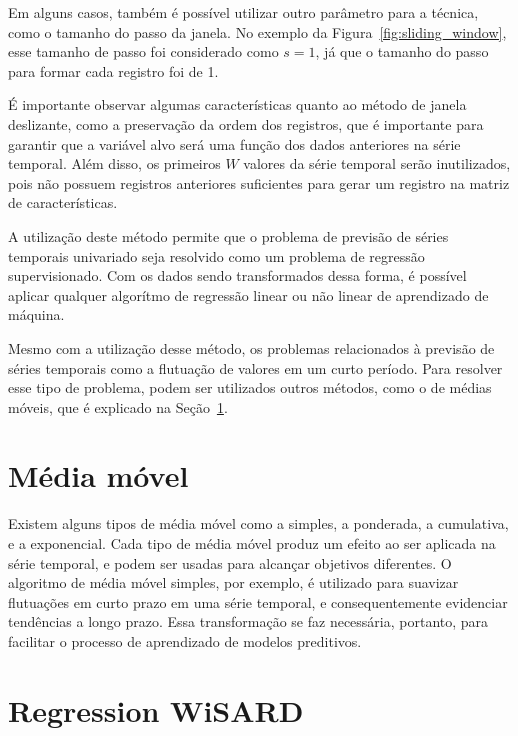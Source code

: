 Em alguns casos, também é possível utilizar outro parâmetro para a técnica, como o tamanho do passo da janela. No exemplo da Figura~\ref{fig:sliding_window}, esse tamanho de passo foi considerado como $s=1$, já que o tamanho do passo para formar cada registro foi de 1.


É importante observar algumas características quanto ao método de janela deslizante, como a preservação da ordem dos registros, que é importante para garantir que a variável alvo será uma função dos dados anteriores na série temporal. Além disso, os primeiros $W$ valores da série temporal serão inutilizados, pois não possuem registros anteriores suficientes para gerar um registro na matriz de características.

A utilização deste método permite que o problema de previsão de séries temporais univariado seja resolvido como um problema de regressão supervisionado. Com os dados sendo transformados dessa forma, é possível aplicar qualquer algorítmo de regressão linear ou não linear de aprendizado de máquina.

Mesmo com a utilização desse método, os problemas relacionados à previsão de séries temporais como a flutuação de valores em um curto período. Para resolver esse tipo de problema, podem ser utilizados outros métodos, como o de médias móveis, que é explicado na Seção~\ref{sec:moving_average}.

\section{Média móvel} \label{sec:moving_average}
Existem alguns tipos de média móvel como a simples, a ponderada, a cumulativa, e a exponencial. Cada tipo de média móvel produz um efeito ao ser aplicada na série temporal, e podem ser usadas para alcançar objetivos diferentes. O algoritmo de média móvel simples, por exemplo, é utilizado para suavizar flutuações em curto prazo em uma série temporal, e consequentemente evidenciar tendências a longo prazo. Essa transformação se faz necessária, portanto, para facilitar o processo de aprendizado de modelos preditivos.



\section{Regression WiSARD}


